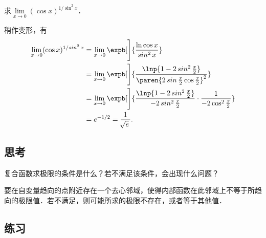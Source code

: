 \begin{example*}
  求\(\lim\limits_{x\to0} (\cos x)^{1/\!\sin^2 x}\)．

  \begin{remark}
    稍作变形，有
    \begin{align*}
      \lim_{x\to0} (\cos x)^{1/\!\sin^2 x}
      &= \lim_{x\to0} \expb[\Bigg]{\frac{\ln \cos x}{\sin^2 x}} \\
      &= \lim_{x\to0} \expb[\Bigg]{
        \frac{\lnp{1 - 2 \sin^2 \frac x2}}{
        \paren{2 \sin\frac x2 \cos\frac x2}^2}} \\
      &= \lim_{x\to0} \expb[\Bigg]{
        \frac{\lnp{1 - 2 \sin^2 \frac x2}}{-2 \sin^2 \frac x2}
        \cdot \frac{1}{-2 \cos^2 \frac x2}} \\
      &= e^{-1/2} = \frac1{\!\sqrt e\,}.
    \end{align*}
  \end{remark}
\end{example*}

\subsection*{思考}

复合函数求极限的条件是什么？若不满足该条件，会出现什么问题？

\ifshowsolp
  \pskip
  要在自变量趋向的点附近存在一个去心邻域，使得内部函数在此邻域上不等于所趋向的极限值．若不满足，则可能所求的极限不存在，或者等于其他值．
\fi

\ifshowex
{}
\subsection*{练习}

